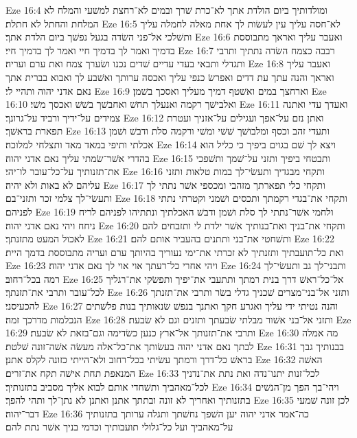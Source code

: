 Eze 16:4  ומולדותיך ביום הולדת אתך לא־כרת שׁרך ובמים לא־רחצת למשׁעי והמלח לא המלחת והחתל לא חתלת׃
Eze 16:5  לא־חסה עליך עין לעשׂות לך אחת מאלה לחמלה עליך ותשׁלכי אל־פני השׂדה בגעל נפשׁך ביום הלדת אתך׃
Eze 16:6  ואעבר עליך ואראך מתבוססת בדמיך ואמר לך בדמיך חיי ואמר לך בדמיך חיי׃
Eze 16:7  רבבה כצמח השׂדה נתתיך ותרבי ותגדלי ותבאי בעדי עדיים שׁדים נכנו ושׂערך צמח ואת ערם ועריה׃
Eze 16:8  ואעבר עליך ואראך והנה עתך עת דדים ואפרשׂ כנפי עליך ואכסה ערותך ואשׁבע לך ואבוא בברית אתך נאם אדני יהוה ותהיי לי׃
Eze 16:9  וארחצך במים ואשׁטף דמיך מעליך ואסכך בשׁמן׃
Eze 16:10  ואלבישׁך רקמה ואנעלך תחשׁ ואחבשׁך בשׁשׁ ואכסך משׁי׃
Eze 16:11  ואעדך עדי ואתנה צמידים על־ידיך ורביד על־גרונך׃
Eze 16:12  ואתן נזם על־אפך ועגילים על־אזניך ועטרת תפארת בראשׁך׃
Eze 16:13  ותעדי זהב וכסף ומלבושׁך שׁשׁי ומשׁי ורקמה סלת ודבשׁ ושׁמן אכלתי ותיפי במאד מאד ותצלחי למלוכה׃
Eze 16:14  ויצא לך שׁם בגוים ביפיך כי כליל הוא בהדרי אשׁר־שׂמתי עליך נאם אדני יהוה׃
Eze 16:15  ותבטחי ביפיך ותזני על־שׁמך ותשׁפכי את־תזנותיך על־כל־עובר לו־יהי׃
Eze 16:16  ותקחי מבגדיך ותעשׂי־לך במות טלאות ותזני עליהם לא באות ולא יהיה׃
Eze 16:17  ותקחי כלי תפארתך מזהבי ומכספי אשׁר נתתי לך ותעשׂי־לך צלמי זכר ותזני־בם׃
Eze 16:18  ותקחי את־בגדי רקמתך ותכסים ושׁמני וקטרתי נתתי לפניהם׃
Eze 16:19  ולחמי אשׁר־נתתי לך סלת ושׁמן ודבשׁ האכלתיך ונתתיהו לפניהם לריח ניחח ויהי נאם אדני יהוה׃
Eze 16:20  ותקחי את־בניך ואת־בנותיך אשׁר ילדת לי ותזבחים להם לאכול המעט מתזנתך׃
Eze 16:21  ותשׁחטי את־בני ותתנים בהעביר אותם להם׃
Eze 16:22  ואת כל־תועבתיך ותזנתיך לא זכרתי את־ימי נעוריך בהיותך ערם ועריה מתבוססת בדמך היית׃
Eze 16:23  ויהי אחרי כל־רעתך אוי אוי לך נאם אדני יהוה׃
Eze 16:24  ותבני־לך גב ותעשׂי־לך רמה בכל־רחוב׃
Eze 16:25  אל־כל־ראשׁ דרך בנית רמתך ותתעבי את־יפיך ותפשׂקי את־רגליך לכל־עובר ותרבי את־תזנתך׃
Eze 16:26  ותזני אל־בני־מצרים שׁכניך גדלי בשׂר ותרבי את־תזנתך להכעיסני׃
Eze 16:27  והנה נטיתי ידי עליך ואגרע חקך ואתנך בנפשׁ שׂנאותיך בנות פלשׁתים הנכלמות מדרכך זמה׃
Eze 16:28  ותזני אל־בני אשׁור מבלתי שׂבעתך ותזנים וגם לא שׂבעת׃
Eze 16:29  ותרבי את־תזנותך אל־ארץ כנען כשׂדימה וגם־בזאת לא שׂבעת׃
Eze 16:30  מה אמלה לבתך נאם אדני יהוה בעשׂותך את־כל־אלה מעשׂה אשׁה־זונה שׁלטת׃
Eze 16:31  בבנותיך גבך בראשׁ כל־דרך ורמתך עשׂיתי בכל־רחוב ולא־הייתי כזונה לקלס אתנן׃
Eze 16:32  האשׁה המנאפת תחת אישׁה תקח את־זרים׃
Eze 16:33  לכל־זנות יתנו־נדה ואת נתת את־נדניך לכל־מאהביך ותשׁחדי אותם לבוא אליך מסביב בתזנותיך׃
Eze 16:34  ויהי־בך הפך מן־הנשׁים בתזנותיך ואחריך לא זונה ובתתך אתנן ואתנן לא נתן־לך ותהי להפך׃
Eze 16:35  לכן זונה שׁמעי דבר־יהוה׃
Eze 16:36  כה־אמר אדני יהוה יען השׁפך נחשׁתך ותגלה ערותך בתזנותיך על־מאהביך ועל כל־גלולי תועבותיך וכדמי בניך אשׁר נתת להם׃
